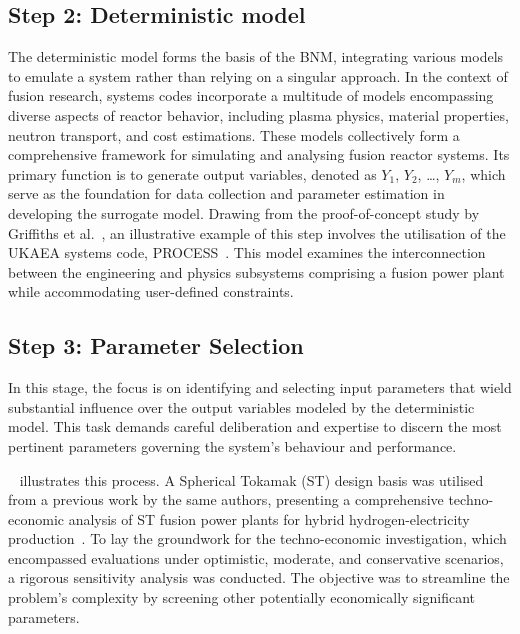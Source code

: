 \documentclass[journal]{IEEEtran}
\begin{document}
\subsection{\textbf{Step 2}: Deterministic model}\label{sec:deterministic}


The deterministic model forms the basis of the BNM, integrating various models to emulate a system rather than relying on a singular approach. In the context of fusion research, systems codes incorporate a multitude of models encompassing diverse aspects of reactor behavior, including plasma physics, material properties, neutron transport, and cost estimations. These models collectively form a comprehensive framework for simulating and analysing fusion reactor systems. Its primary function is to generate output variables, denoted as $Y_1$, $Y_2$, \ldots, $Y_m$, which serve as the foundation for data collection and parameter estimation in developing the surrogate model. Drawing from the proof-of-concept study by Griffiths et al.~\cite{Griffiths2024}, an illustrative example of this step involves the utilisation of the UKAEA systems code, PROCESS~\cite{Kovari2014, Kovari2016}. This model examines the interconnection between the engineering and physics subsystems comprising a fusion power plant while accommodating user-defined constraints.

\subsection{\textbf{Step 3}: Parameter Selection}\label{sec:parameters} 
In this stage, the focus is on identifying and selecting input parameters that wield substantial influence over the output variables modeled by the deterministic model. This task demands careful deliberation and expertise to discern the most pertinent parameters governing the system's behaviour and performance.

~\cite{Griffiths2024} illustrates this process. A Spherical Tokamak (ST) design basis was utilised from a previous work by the same authors, presenting a comprehensive techno-economic analysis of ST fusion power plants for hybrid hydrogen-electricity production~\cite{Hidalgo-Salaverri2023}. To lay the groundwork for the techno-economic investigation, which encompassed evaluations under optimistic, moderate, and conservative scenarios, a rigorous sensitivity analysis was conducted. The objective was to streamline the problem's complexity by screening other potentially economically significant parameters.
\end{document}
